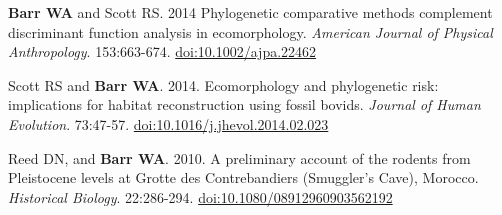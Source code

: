 \item  {\bfseries Barr WA} and Scott RS. 2014 Phylogenetic comparative methods complement discriminant function analysis in ecomorphology. \emph{American Journal of Physical Anthropology}. 153:663-674. \href{http://dx.doi.org/10.1002/ajpa.22462}{doi:10.1002/ajpa.22462}

\item  Scott RS and {\bfseries Barr WA}. 2014. Ecomorphology and phylogenetic risk: implications for habitat reconstruction using fossil bovids. \emph{Journal of Human Evolution}. 73:47-57. \href{http://dx.doi.org/10.1016/j.jhevol.2014.02.023}{doi:10.1016/j.jhevol.2014.02.023}

\item  Reed DN, and {\bfseries Barr WA}. 2010. A preliminary account of the rodents from Pleistocene levels at Grotte des Contrebandiers (Smuggler's Cave), Morocco. \emph{Historical Biology}. 22:286-294. \href{http://dx.doi.org/10.1080/08912960903562192}{doi:10.1080/08912960903562192}




